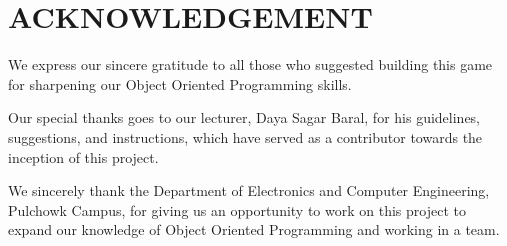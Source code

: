 \newpage
{}
\section{ACKNOWLEDGEMENT}


We express our sincere gratitude to all those who suggested building this game for sharpening our Object Oriented Programming skills.

\vspace{5mm}
Our special thanks goes to our lecturer, Daya Sagar Baral, for his guidelines, suggestions, and instructions, which have served as a contributor towards the inception of this project.

\vspace{5mm}
We sincerely thank the Department of Electronics and Computer Engineering, Pulchowk Campus, for giving us an opportunity to work on this project to expand our knowledge of Object Oriented Programming and working in a team.
